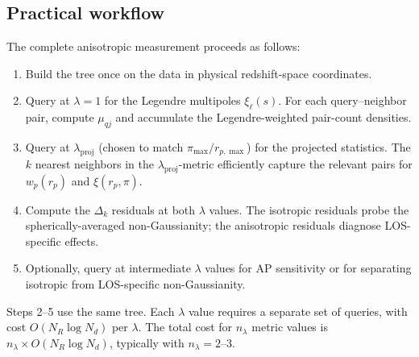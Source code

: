 \subsection{Practical workflow}
\label{sec:aniso_workflow}

The complete anisotropic measurement proceeds as follows:
\begin{enumerate}[nosep]
  \item Build the tree once on the data in physical redshift-space coordinates.
  \item Query at $\lambda = 1$ for the Legendre multipoles $\xi_\ell(s)$.  For each query--neighbor pair, compute $\mu_{qj}$ and accumulate the Legendre-weighted pair-count densities.
  \item Query at $\lambda_{\mathrm{proj}}$ (chosen to match $\pi_{\max}/r_{p,\max}$) for the projected statistics.  The $k$ nearest neighbors in the $\lambda_{\mathrm{proj}}$-metric efficiently capture the relevant pairs for $w_p(r_p)$ and $\xi(r_p, \pi)$.
  \item Compute the $\Delta_k$ residuals at both $\lambda$ values.  The isotropic residuals probe the spherically-averaged non-Gaussianity; the anisotropic residuals diagnose LOS-specific effects.
  \item Optionally, query at intermediate $\lambda$ values for AP sensitivity or for separating isotropic from LOS-specific non-Gaussianity.
\end{enumerate}
Steps 2--5 use the same tree.  Each $\lambda$ value requires a separate set of queries, with cost $O(N_R\log N_d)$ per $\lambda$.  The total cost for $n_\lambda$ metric values is $n_\lambda \times O(N_R\log N_d)$, typically with $n_\lambda = 2$--$3$.
